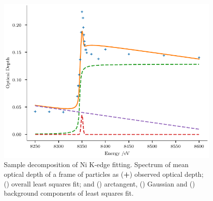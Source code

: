 \documentclass{article}
\begin{document}
\begin{figure}
  \includegraphics{figures/kedge-decomposition.pdf}
  \caption{Sample decomposition of Ni K-edge fitting. Spectrum of mean
    optical depth of a frame of \nca{} particles as
    (\textcolor{C0}{\textbf{+}}) observed optical depth;
    (\textcolor{C1}{\mplline{}}) overall least squares fit; and
    (\textcolor{C2}{\mpldashes{}}) arctangent,
    (\textcolor{C3}{\mpldashes{}}) Gaussian and
    (\textcolor{C4}{\mpldashes{}}) background components of least
    squares fit.}
  \label{fig:kedge-decomposition}
\end{figure}
\end{document}
